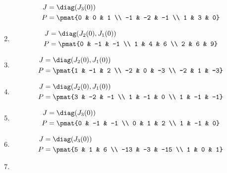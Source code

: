 \begin{enumerate}
\begin{align*}
J &= \diag(J_{3}(0))\\
P &= \pmat{0 & 0 & 1 \\ -1 & -2 & -1 \\ 1 & 3 & 0}
\end{align*}

\item

\begin{align*}
J &= \diag(J_{2}(0), J_{1}(0))\\
P &= \pmat{0 & -1 & -1 \\ 1 & 4 & 6 \\ 2 & 6 & 9}
\end{align*}

\item

\begin{align*}
J &= \diag(J_{2}(0), J_{1}(0))\\
P &= \pmat{1 & -1 & 2 \\ -2 & 0 & -3 \\ -2 & 1 & -3}
\end{align*}

\item

\begin{align*}
J &= \diag(J_{2}(0), J_{1}(0))\\
P &= \pmat{3 & -2 & -1 \\ 1 & -1 & 0 \\ 1 & -1 & -1}
\end{align*}

\item

\begin{align*}
J &= \diag(J_{3}(0))\\
P &= \pmat{0 & -1 & -1 \\ 0 & 1 & 2 \\ 1 & -1 & 0}
\end{align*}

\item

\begin{align*}
J &= \diag(J_{3}(0))\\
P &= \pmat{5 & 1 & 6 \\ -13 & -3 & -15 \\ 1 & 0 & 1}
\end{align*}

\item


\end{enumerate}
